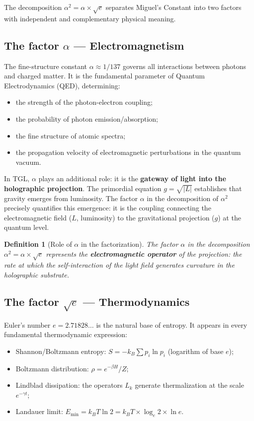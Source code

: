 \documentclass[12pt,a4paper,twoside]{article}
\newtheorem{definition}[theorem]{Definition}
\newcommand{\alphaii}{\alpha^{2}}
\begin{document}
The decomposition $\alphaii = \alpha \times \sqrt{e}$ separates Miguel's Constant into two factors with independent and complementary physical meaning.

\subsection{The factor $\alpha$ --- Electromagnetism}

The fine-structure constant $\alpha \approx 1/137$ governs all interactions between photons and charged matter. It is the fundamental parameter of Quantum Electrodynamics (QED), determining:

\begin{itemize}[nosep]
\item the strength of the photon-electron coupling;
\item the probability of photon emission/absorption;
\item the fine structure of atomic spectra;
\item the propagation velocity of electromagnetic perturbations in the quantum vacuum.
\end{itemize}

In TGL, $\alpha$ plays an additional role: it is the \textbf{gateway of light into the holographic projection}. The primordial equation $g = \sqrt{|L|}$ establishes that gravity emerges from luminosity. The factor $\alpha$ in the decomposition of $\alphaii$ precisely quantifies this emergence: it is the coupling connecting the electromagnetic field ($L$, luminosity) to the gravitational projection ($g$) at the quantum level.

\begin{definition}[Role of $\alpha$ in the factorization]
The factor $\alpha$ in the decomposition $\alphaii = \alpha \times \sqrt{e}$ represents the \textbf{electromagnetic operator} of the projection: the rate at which the self-interaction of the light field generates curvature in the holographic substrate.
\end{definition}

\subsection{The factor $\sqrt{e}$ --- Thermodynamics}

Euler's number $e = 2.71828\ldots$ is the natural base of entropy. It appears in every fundamental thermodynamic expression:

\begin{itemize}[nosep]
\item Shannon/Boltzmann entropy: $S = -k_B \sum p_i \ln p_i$ (logarithm of base $e$);
\item Boltzmann distribution: $\rho = e^{-\beta H} / Z$;
\item Lindblad dissipation: the operators $L_k$ generate thermalization at the scale $e^{-\gamma t}$;
\item Landauer limit: $E_{\min} = k_B T \ln 2 = k_B T \times \log_e 2 \times \ln e$.
\end{itemize}
\end{document}
